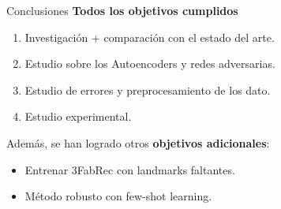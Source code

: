 \documentclass[aspectratio=43]{beamer}
\begin{document}
\begin{frame}[t]{Conclusiones}
  \normalsize \textbf{Todos los objetivos cumplidos}
  \begin{enumerate}
    \item \small Investigación + comparación con el estado del arte.
    \item \small Estudio sobre los Autoencoders y redes adversarias.
    \item \small Estudio de errores y preprocesamiento de los dato.
    \item \small Estudio experimental.
  \end{enumerate}

  \medskip

  \normalsize Además, se han logrado otros \textbf{objetivos adicionales}:
  \begin{itemize}
    \item \small Entrenar 3FabRec con landmarks faltantes.
    \item \small Método robusto con few-shot learning.
  \end{itemize}
\end{frame}
\end{document}
